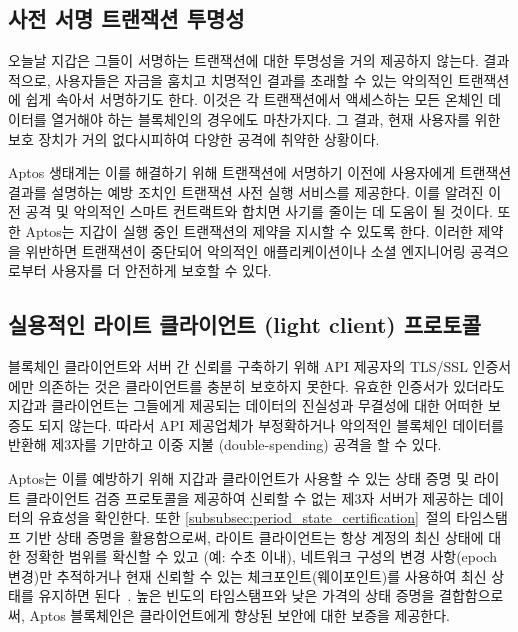 \documentclass{article}
\begin{document}
\subsection{사전 서명 트랜잭션 투명성}
\label{sub:pre-signing_transaction_transparency}

오늘날 지갑은 그들이 서명하는 트랜잭션에 대한 투명성을 거의 제공하지 않는다. 결과적으로, 사용자들은 자금을 훔치고 치명적인 결과를 초래할 수 있는 악의적인 트랜잭션에 쉽게 속아서 서명하기도 한다. 이것은 각 트랜잭션에서 액세스하는 모든 온체인 데이터를 열거해야 하는 블록체인의 경우에도 마찬가지다. 그 결과, 현재 사용자를 위한 보호 장치가 거의 없다시피하여 다양한 공격에 취약한 상황이다.

Aptos 생태계는 이를 해결하기 위해 트랜잭션에 서명하기 이전에 사용자에게 트랜잭션 결과를 설명하는 예방 조치인 트랜잭션 사전 실행 서비스를 제공한다. 이를 알려진 이전 공격 및 악의적인 스마트 컨트랙트와 합치면 사기를 줄이는 데 도움이 될 것이다. 또한 Aptos는 지갑이 실행 중인 트랜잭션의 제약을 지시할 수 있도록 한다. 이러한 제약을 위반하면 트랜잭션이 중단되어 악의적인 애플리케이션이나 소셜 엔지니어링 공격으로부터 사용자를 더 안전하게 보호할 수 있다.

\subsection{실용적인 라이트 클라이언트 (light client) 프로토콜}
\label{practical_light_client_protocols}

블록체인 클라이언트와 서버 간 신뢰를 구축하기 위해 API 제공자의 TLS/SSL 인증서에만 의존하는 것은 클라이언트를 충분히 보호하지 못한다. 유효한 인증서가 있더라도 지갑과 클라이언트는 그들에게 제공되는 데이터의 진실성과 무결성에 대한 어떠한 보증도 되지 않는다. 따라서 API 제공업체가 부정확하거나 악의적인 블록체인 데이터를 반환해 제3자를 기만하고 이중 지불 (double-spending) 공격을 할 수 있다.

Aptos는 이를 예방하기 위해 지갑과 클라이언트가 사용할 수 있는 상태 증명 및 라이트 클라이언트 검증 프로토콜을 제공하여 신뢰할 수 없는 제3자 서버가 제공하는 데이터의 유효성을 확인한다. 또한 \ref{subsubsec:period_state_certification}~절의 타임스탬프 기반 상태 증명을 활용함으로써, 라이트 클라이언트는 항상 계정의 최신 상태에 대한 정확한 범위를 확신할 수 있고 (예: 수초 이내), 네트워크 구성의 변경 사항(epoch 변경)만 추적하거나 현재 신뢰할 수 있는 체크포인트(웨이포인트)를 사용하여 최신 상태를 유지하면 된다~\cite{waypoints}. 높은 빈도의 타임스탬프와 낮은 가격의 상태 증명을 결합함으로써, Aptos 블록체인은 클라이언트에게 향상된 보안에 대한 보증을 제공한다.
\end{document}
